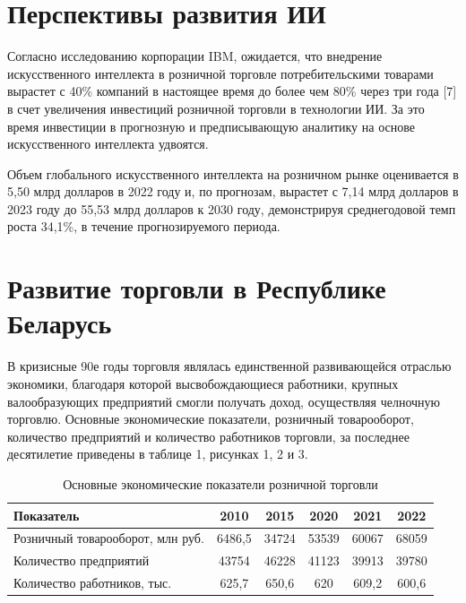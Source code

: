 \documentclass{article}
\begin{document}
\section*{\hspace{10mm}Перспективы развития ИИ}
\normalsize{\hspace{5mm}Согласно исследованию корпорации IBM, ожидается, что внедрение искусственного интеллекта в розничной торговле потребительскими товарами вырастет с 40\% компаний в настоящее время до более чем 80\% через три года [7] в счет увеличения инвестиций розничной торговли в технологии ИИ. За это время инвестиции в прогнозную и предписывающую аналитику на основе искусственного интеллекта удвоятся.

Объем глобального искусственного интеллекта на розничном рынке оценивается в 5,50 млрд долларов в 2022 году и, по прогнозам, вырастет с 7,14 млрд долларов в 2023 году до 55,53 млрд долларов к 2030 году, демонстрируя среднегодовой темп роста 34,1\%, в течение прогнозируемого периода.}
\section*{\hspace{10mm}Развитие торговли в Республике Беларусь}
\normalsize{\hspace{5mm}В кризисные 90е годы торговля являлась единственной развивающейся отраслью экономики, благодаря которой высвобождающиеся работники, крупных валообразующих предприятий смогли получать доход, осуществляя челночную торговлю. Основные экономические показатели, розничный товарооборот, количество предприятий и количество работников торговли, за последнее десятилетие приведены в таблице 1, рисунках 1, 2 и 3.}

\begin{table}[t]
    \begin{tabular}{||p{}|c|c|c|c|c||}
    \hline Показатель & 2010 & 2015 & 2020 & 2021 & 2022 \\
    \hline  
    Розничный товарооборот, млн руб. & 6486,5 & 34724 & 53539 & 60067 & 68059\\
    \hline 
    Количество предприятий & 43754 & 46228 & 41123 & 39913 & 39780 \\
    \hline 
    Количество работников, тыс. & 625,7 & 650,6 & 620 & 609,2 & 600,6 \\
    \hline 
    \end{tabular}
    \bfseries\caption{Основные экономические показатели розничной торговли}
\end{table}
\end{document}
